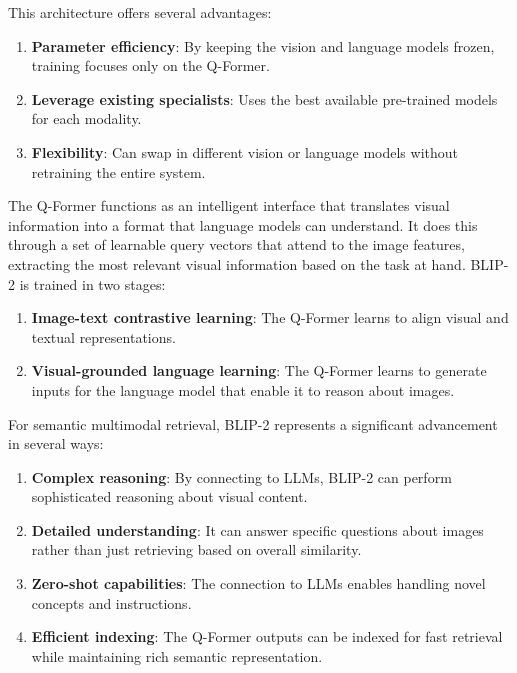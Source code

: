 \documentclass[conference]{IEEEtran}
\begin{document}
\begin{enumerate}
This architecture offers several advantages:

\begin{enumerate}
    \item \textbf{Parameter efficiency}: By keeping the vision and language models frozen, training focuses only on the Q-Former.
    \item \textbf{Leverage existing specialists}: Uses the best available pre-trained models for each modality.
    \item \textbf{Flexibility}: Can swap in different vision or language models without retraining the entire system.
\end{enumerate}

The Q-Former functions as an intelligent interface that translates visual information into a format that language models can understand. It does this through a set of learnable query vectors that attend to the image features, extracting the most relevant visual information based on the task at hand.
BLIP-2 is trained in two stages:

\begin{enumerate}
    \item \textbf{Image-text contrastive learning}: The Q-Former learns to align visual and textual representations.
    \item \textbf{Visual-grounded language learning}: The Q-Former learns to generate inputs for the language model that enable it to reason about images.
\end{enumerate}

For semantic multimodal retrieval, BLIP-2 represents a significant advancement in several ways:

\begin{enumerate}
    \item \textbf{Complex reasoning}: By connecting to LLMs, BLIP-2 can perform sophisticated reasoning about visual content.
    \item \textbf{Detailed understanding}: It can answer specific questions about images rather than just retrieving based on overall similarity.
    \item \textbf{Zero-shot capabilities}: The connection to LLMs enables handling novel concepts and instructions.
    \item \textbf{Efficient indexing}: The Q-Former outputs can be indexed for fast retrieval while maintaining rich semantic representation.
\end{enumerate}


\end{enumerate}
\end{document}
